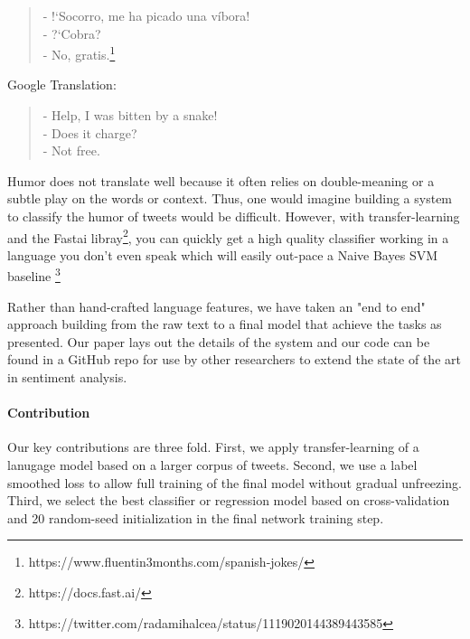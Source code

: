 \documentclass[smallextended]{svjour3}       %
\begin{document}
\begin{quote}
- !`Socorro, me ha picado una víbora!\\
- ?`Cobra?\\
- No, gratis.\footnote{https://www.fluentin3months.com/spanish-jokes/}
\end{quote}
Google Translation:
\begin{quote}
- Help, I was bitten by a snake!\\
- Does it charge?\\
- Not free.
\end{quote}
Humor does not translate well because it often relies on double-meaning or a subtle play on the words or context.  Thus, one would imagine building a system to classify the humor of tweets would be difficult.  However, with transfer-learning and the Fastai libray\footnote{https://docs.fast.ai/}, you can quickly get a high quality classifier working in a language you don't even speak which will easily out-pace a Naive Bayes SVM baseline \footnote{https://twitter.com/radamihalcea/status/1119020144389443585}

Rather than hand-crafted language features, we have taken an "end to end" approach building from the raw text to a final model that achieve the tasks as presented.  Our paper lays out the details of the system and our code can be found in a GitHub repo for use by other researchers to extend the state of the art in sentiment analysis. 

\paragraph{Contribution} Our key contributions are three fold.  First, we apply transfer-learning of a lanugage model based on a larger corpus of tweets.  Second, we use a label smoothed loss to allow full training of the final model without gradual unfreezing.  Third, we select the best classifier or regression model based on cross-validation and 20 random-seed initialization in the final network training step.
\end{document}
